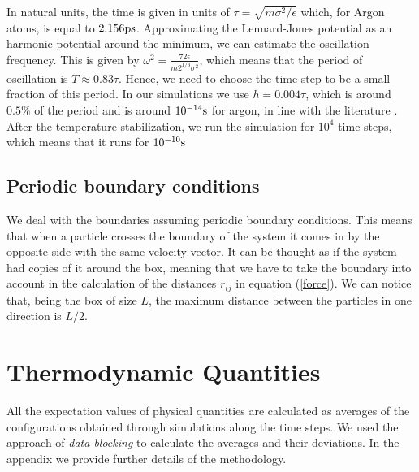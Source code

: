 \documentclass[aps,prl,reprint,groupedaddress]{revtex4-1}
\begin{document}
In natural units, the time is given in units of $\tau = \sqrt{m \sigma^2/\epsilon}$ which, for Argon atoms, is equal to $2.156 \textup{ps}$. Approximating the Lennard-Jones potential as an harmonic potential around the minimum, we can estimate the oscillation frequency. This is given by $\omega^2 = \frac{72 \epsilon}{m 2^{1/3} \sigma^2}$, which means that the period of oscillation is $T \approx 0.83 \tau$. Hence, we need to choose the time step to be a small fraction of this period. In our simulations we use $h = 0.004 \tau$, which is around $0.5 \%$ of the period and is around $10^{-14} \textup{s}$ for argon, in line with the literature \cite{Rahman1964}. After the temperature stabilization, we run the simulation for $10^4$ time steps, which means that it runs for $10^{-10} \textup{s}$

\subsection{Periodic boundary conditions}

We deal with the boundaries assuming periodic boundary conditions. This means that when a particle crosses the boundary of the system it comes in by the opposite side with the same velocity vector. It can be thought as if the system had copies of it around the box, meaning that we have to take the boundary into account in the calculation of the distances $r_{ij}$ in equation (\ref{force}). We can notice that, being the box of size $L$, the maximum distance between the particles in one direction is $L/2$.

\section{Thermodynamic Quantities \label{thermo}}

All the expectation values of physical quantities are calculated as averages of the configurations obtained through simulations along the time steps. We used the approach of \textit{data blocking} to calculate the averages and their deviations. In the appendix we provide further details of the methodology. 
\end{document}
